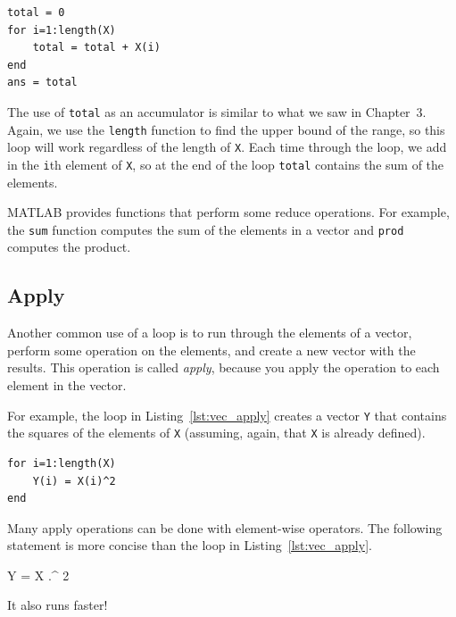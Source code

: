 \begin{lstlisting}[caption={Reducing a vector to a single scalar value (the sum)}, label={lst:vec_reduce}]
total = 0
for i=1:length(X)
    total = total + X(i)
end
ans = total
\end{lstlisting}

The use of \lstinline{total} as an accumulator is similar to what we
saw in Chapter~3.  Again, we use the \lstinline{length} function
to find the upper bound of the range, so this loop will work
regardless of the length of \lstinline{X}.
Each time through the loop, we add
in the \lstinline{i}th element of \lstinline{X}, so at the end of the loop
\lstinline{total} contains the sum of the elements.


MATLAB provides functions that perform some reduce operations.
For example, the \lstinline{sum} function computes the sum of the elements
in a vector and \lstinline{prod} computes the product.


\subsection{Apply}
\label{apply}

Another common use of a loop is to run through the elements of
a vector, perform some operation on the elements, and create
a new vector with the results.  This operation is called
\emph{apply}, because you apply the operation to each element in
the vector.


For example, the loop in Listing~\ref{lst:vec_apply} creates a vector \lstinline{Y} that
contains the squares of the elements of \lstinline{X} (assuming, again, that \lstinline{X} is already defined).

\begin{lstlisting}[caption={Making a new vector Y by squaring the elements in X}, label={lst:vec_apply}]
for i=1:length(X)
    Y(i) = X(i)^2
end
\end{lstlisting}

Many apply operations can be done with element-wise operators.
The following statement is more concise than the loop in
Listing~\ref{lst:vec_apply}.

\begin{code}
Y = X .^ 2
\end{code}

It also runs faster!


